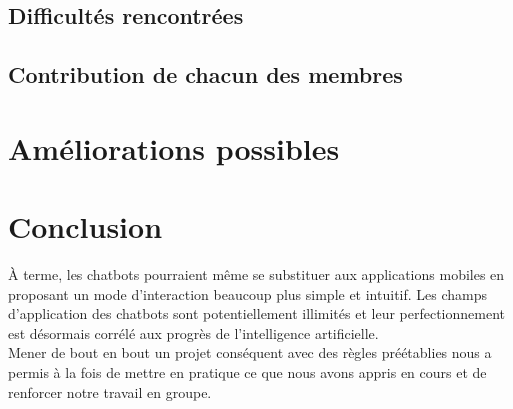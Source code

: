 \documentclass{report}
\begin{document}
\subsection{Difficultés rencontrées}
\subsection{Contribution de chacun des membres}
\section{Améliorations possibles}
\section*{Conclusion}À terme, les chatbots pourraient même se substituer aux applications mobiles en proposant un mode d'interaction beaucoup plus simple et intuitif. Les champs d'application des chatbots sont potentiellement illimités et leur perfectionnement est désormais corrélé aux progrès de l'intelligence artificielle.\\

Mener de bout en bout un projet conséquent avec des règles préétablies nous a permis à la fois de mettre en pratique ce que nous avons appris en cours et de renforcer notre travail en groupe.
\end{document}
